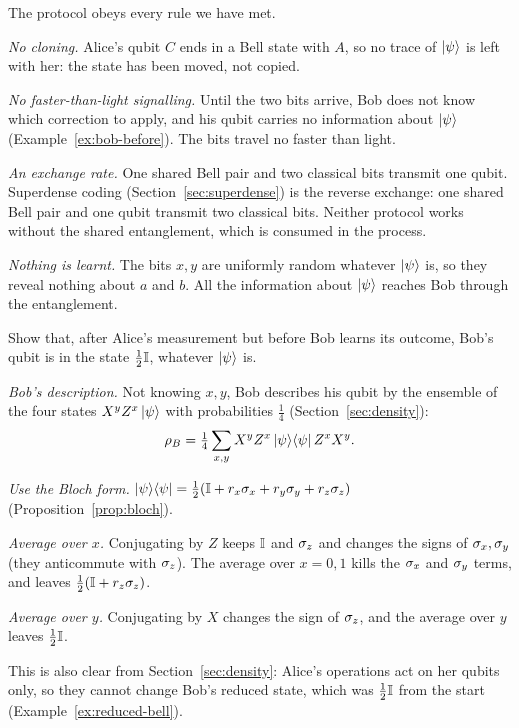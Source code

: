 The protocol obeys every rule we have met.
\begin{steps}
  \item \emph{No cloning.} Alice's qubit $C$ ends in a Bell state with $A$, so no trace of $\left|\psi\right\rangle$ is left with her: the state has been moved, not copied.
  \item \emph{No faster-than-light signalling.} Until the two bits arrive, Bob does not know which correction to apply, and his qubit carries no information about $\left|\psi\right\rangle$ (Example~\ref{ex:bob-before}). The bits travel no faster than light.
  \item \emph{An exchange rate.} One shared Bell pair and two classical bits transmit one qubit. Superdense coding (Section~\ref{sec:superdense}) is the reverse exchange: one shared Bell pair and one qubit transmit two classical bits. Neither protocol works without the shared entanglement, which is consumed in the process.
  \item \emph{Nothing is learnt.} The bits $x,y$ are uniformly random whatever $\left|\psi\right\rangle$ is, so they reveal nothing about $a$ and $b$. All the information about $\left|\psi\right\rangle$ reaches Bob through the entanglement.
\end{steps}

\begin{example}\label{ex:bob-before}
  Show that, after Alice's measurement but before Bob learns its outcome, Bob's qubit is in the state $\tfrac12\mathbb{I}$, whatever $\left|\psi\right\rangle$ is.
\end{example}
\begin{solution}
  \begin{steps}
    \item \emph{Bob's description.} Not knowing $x,y$, Bob describes his qubit by the ensemble of the four states $X^yZ^x\left|\psi\right\rangle$ with probabilities $\tfrac14$ (Section~\ref{sec:density}):
      \[
        \rho_B=\tfrac14\sum_{x,y}X^yZ^x\left|\psi\right\rangle\!\left\langle\psi\right| Z^xX^y .
      \]
    \item \emph{Use the Bloch form.} $\left|\psi\right\rangle\!\left\langle\psi\right|=\tfrac12(\mathbb{I}+r_x\sigma_x+r_y\sigma_y+r_z\sigma_z)$ (Proposition~\ref{prop:bloch}).
    \item \emph{Average over $x$.} Conjugating by $Z$ keeps $\mathbb{I}$ and $\sigma_z$ and changes the signs of $\sigma_x,\sigma_y$ (they anticommute with $\sigma_z$). The average over $x=0,1$ kills the $\sigma_x$ and $\sigma_y$ terms, and leaves $\tfrac12(\mathbb{I}+r_z\sigma_z)$.
    \item \emph{Average over $y$.} Conjugating by $X$ changes the sign of $\sigma_z$, and the average over $y$ leaves $\tfrac12\mathbb{I}$.
  \end{steps}
  This is also clear from Section~\ref{sec:density}: Alice's operations act on her qubits only, so they cannot change Bob's reduced state, which was $\tfrac12\mathbb{I}$ from the start (Example~\ref{ex:reduced-bell}).
\end{solution}

